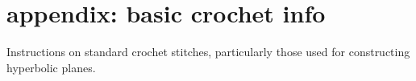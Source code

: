 \documentclass[letterpaper,titlepage]{article}
\begin{document}

\section*{appendix: basic crochet info}
Instructions on standard crochet stitches, particularly those used for constructing hyperbolic planes. \cite{happyhooker}

\newpage


\end{document}
